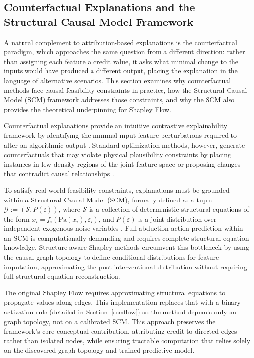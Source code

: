 \documentclass[12pt,a4paper,oneside]{article}
\begin{document}
\subsection{Counterfactual Explanations and the Structural Causal Model Framework}

A natural complement to attribution-based explanations is the counterfactual paradigm, which approaches the same question from a different direction: rather than assigning each feature a credit value, it asks what minimal change to the inputs would have produced a different output, placing the explanation in the language of alternative scenarios. This section examines why counterfactual methods face causal feasibility constraints in practice, how the Structural Causal Model (SCM) framework addresses those constraints, and why the SCM also provides the theoretical underpinning for Shapley Flow.

Counterfactual explanations provide an intuitive contrastive explainability framework by identifying the minimal input feature perturbations required to alter an algorithmic output \citep{Wachter2018}. Standard optimization methods, however, generate counterfactuals that may violate physical plausibility constraints by placing instances in low-density regions of the joint feature space or proposing changes that contradict causal relationships \citep{Mahajan2020}.

To satisfy real-world feasibility constraints, explanations must be grounded within a Structural Causal Model (SCM), formally defined as a tuple $\mathcal{G} := (\mathcal{S}, P(\varepsilon))$, where $\mathcal{S}$ is a collection of deterministic structural equations of the form $x_i = f_i(\mathrm{Pa}(x_i), \varepsilon_i)$, and $P(\varepsilon)$ is a joint distribution over independent exogenous noise variables \citep{Pearl2009}. Full abduction-action-prediction within an SCM is computationally demanding and requires complete structural equation knowledge. Structure-aware Shapley methods circumvent this bottleneck by using the causal graph topology to define conditional distributions for feature imputation, approximating the post-interventional distribution without requiring full structural equation reconstruction.

The original Shapley Flow \citep{Wang2021} requires approximating structural equations to propagate values along edges. This implementation replaces that with a binary activation rule (detailed in Section~\ref{sec:flow}) so the method depends only on graph topology, not on a calibrated SCM. This approach preserves the framework's core conceptual contribution, attributing credit to directed edges rather than isolated nodes, while ensuring tractable computation that relies solely on the discovered graph topology and trained predictive model.
\end{document}
